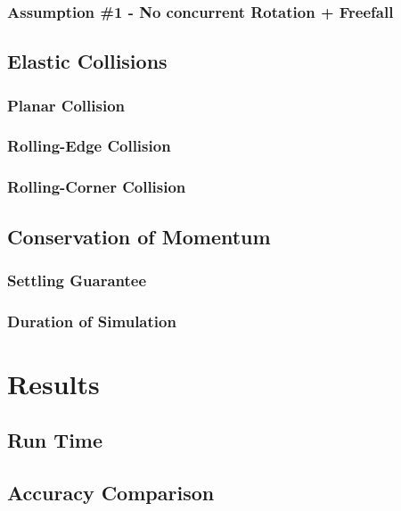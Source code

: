 		\subsubsection{Assumption \#1 - No concurrent Rotation + Freefall}

	\subsection{Elastic Collisions}

		\subsubsection{Planar Collision}

		\subsubsection{Rolling-Edge Collision}

		\subsubsection{Rolling-Corner Collision}

	\subsection{Conservation of Momentum}

		\subsubsection{Settling Guarantee}

		\subsubsection{Duration of Simulation}



\section{Results}

	\subsection{Run Time}

	\subsection{Accuracy Comparison}

